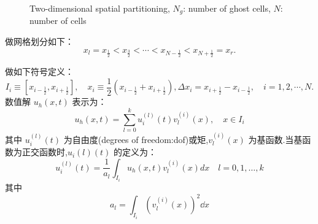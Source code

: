 \documentclass{book}
\begin{document}
\begin{figure}
    \centering
    \caption{Two-dimensional spatial partitioning, $N_g$: number of ghost cells, $N$: number of cells}
\end{figure}


做网格划分如下：
\begin{equation}
    x_{l}=x_{\frac{1}{2}}<x_{\frac{3}{2}}<\cdots<x_{N-\frac{1}{2}}<x_{N+\frac{1}{2}}=x_{r} .
\end{equation}

做如下符号定义：
\begin{equation}
    I_{i} \equiv\left[x_{i-\frac{1}{2}}, x_{i+\frac{1}{2}}\right], \quad x_{i} \equiv \frac{1}{2}\left(x_{i-\frac{1}{2}}+x_{i+\frac{1}{2}}\right),        \Delta x_{i}=x_{i+\frac{1}{2}}-x_{i-\frac{1}{2}}, \quad i=1,2, \cdots, N .
\end{equation}
数值解 $u_h(x,t)$ 表示为：
\begin{equation}
    u_{h}(x, t)=\sum_{l=0}^{k} u_{i}^{(l)}(t) v_{l}^{(i)}(x), \quad x \in I_{i}
\end{equation}
其中 $u_i^{(l)}(t)$ 为自由度(degrees of freedom:dof)或矩,$v_l^{(i)}(x)$ 为基函数.当基函数为正交函数时,$u_i{(l)}(t)$ 的定义为：
\begin{equation}
    u_{i}^{(l)}(t)=\frac{1}{a_{l}} \int_{I_{i}} u_{h}(x, t) v_{l}^{(i)}(x) d x \quad l=0,1, \ldots, k
\end{equation}
其中
\begin{equation}
    a_{l}=\int_{I_{i}}\left(v_{l}^{(i)}(x)\right)^{2} \dd x
\end{equation}
\end{document}
